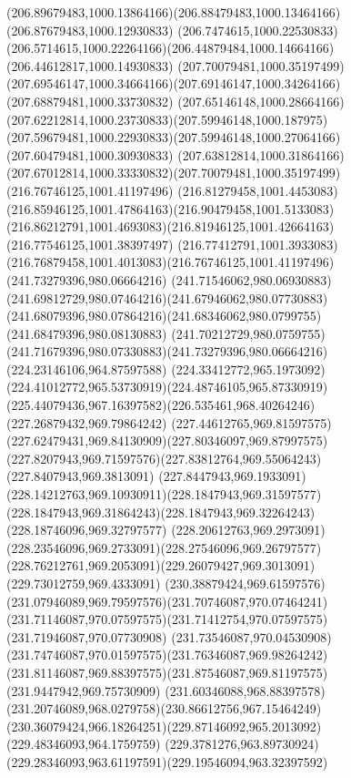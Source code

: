 {{		\curveto(206.89679483,1000.13864166)(206.88479483,1000.13464166)(206.87679483,1000.12930833)
		\curveto(206.7474615,1000.22530833)(206.5714615,1000.22264166)(206.44879484,1000.14664166)
		\lineto(206.44612817,1000.14930833)
		\moveto(207.70079481,1000.35197499)
		\curveto(207.69546147,1000.34664166)(207.69146147,1000.34264166)(207.68879481,1000.33730832)
		\curveto(207.65146148,1000.28664166)(207.62212814,1000.23730833)(207.59946148,1000.187975)
		\curveto(207.59679481,1000.22930833)(207.59946148,1000.27064166)(207.60479481,1000.30930833)
		\curveto(207.63812814,1000.31864166)(207.67012814,1000.33330832)(207.70079481,1000.35197499)
		\moveto(216.76746125,1001.41197496)
		\curveto(216.81279458,1001.4453083)(216.85946125,1001.47864163)(216.90479458,1001.5133083)
		\curveto(216.86212791,1001.4693083)(216.81946125,1001.42664163)(216.77546125,1001.38397497)
		\curveto(216.77412791,1001.3933083)(216.76879458,1001.4013083)(216.76746125,1001.41197496)
		\moveto(241.73279396,980.06664216)
		\curveto(241.71546062,980.06930883)(241.69812729,980.07464216)(241.67946062,980.07730883)
		\curveto(241.68079396,980.07864216)(241.68346062,980.0799755)(241.68479396,980.08130883)
		\curveto(241.70212729,980.0759755)(241.71679396,980.07330883)(241.73279396,980.06664216)
		\moveto(224.23146106,964.87597588)
		\curveto(224.33412772,965.1973092)(224.41012772,965.53730919)(224.48746105,965.87330919)
		\curveto(225.44079436,967.16397582)(226.535461,968.40264246)(227.26879432,969.79864242)
		\curveto(227.44612765,969.81597575)(227.62479431,969.84130909)(227.80346097,969.87997575)
		\curveto(227.8207943,969.71597576)(227.83812764,969.55064243)(227.8407943,969.3813091)
		\curveto(227.8447943,969.1933091)(228.14212763,969.10930911)(228.1847943,969.31597577)
		\curveto(228.1847943,969.31864243)(228.1847943,969.32264243)(228.18746096,969.32797577)
		\curveto(228.20612763,969.2973091)(228.23546096,969.2733091)(228.27546096,969.26797577)
		\curveto(228.76212761,969.2053091)(229.26079427,969.3013091)(229.73012759,969.4333091)
		\curveto(230.38879424,969.61597576)(231.07946089,969.79597576)(231.70746087,970.07464241)
		\curveto(231.71146087,970.07597575)(231.71412754,970.07597575)(231.71946087,970.07730908)
		\curveto(231.73546087,970.04530908)(231.74746087,970.01597575)(231.76346087,969.98264242)
		\curveto(231.81146087,969.88397575)(231.87546087,969.81197575)(231.9447942,969.75730909)
		\curveto(231.60346088,968.88397578)(231.20746089,968.0279758)(230.86612756,967.15464249)
		\curveto(230.36079424,966.18264251)(229.87146092,965.2013092)(229.48346093,964.1759759)
		\curveto(229.3781276,963.89730924)(229.28346093,963.61197591)(229.19546094,963.32397592)
}}
